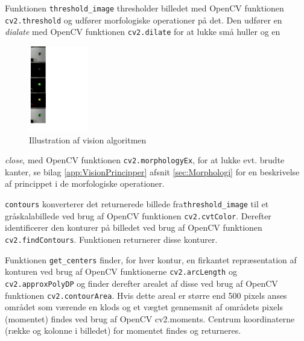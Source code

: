 Funktionen \texttt{threshold\_image} thresholder billedet med OpenCV funktionen \texttt{cv2.threshold} og udfører morfologiske operationer på det.
Den udfører en \textit{dialate} med OpenCV funktionen \texttt{cv2.dilate} for at lukke små huller og en

\begin{figure}
  \begin{center}
    \includegraphics[width=0.23\textwidth]{figurer/ImagesFromVision}
  \end{center}
  \caption{Illustration af vision algoritmen}\label{fig:ImagesFromVision}
\end{figure}

\textit{close}, med OpenCV funktionen \texttt{cv2.morphologyEx}, for at lukke evt. brudte kanter, se bilag \ref{app:VisionPrincipper} afsnit \vref{sec:Morphologi} for en beskrivelse af princippet i de morfologiske operationer.

\texttt{contours} konverterer det returnerede billede fra\newline \texttt{threshold\_image} til et gråskalabillede ved brug af OpenCV funktionen \texttt{cv2.cvtColor}.
Derefter identificerer den konturer på billedet ved brug af OpenCV funktionen \texttt{cv2.findContours}.
Funktionen returnerer disse konturer.

Funktionen \texttt{get\_centers} finder, for hver kontur, en firkantet repræsentation af konturen ved brug af OpenCV funktionerne \texttt{cv2.arcLength} og \texttt{cv2.approxPolyDP} og finder derefter arealet af disse ved brug af OpenCV funktionen \texttt{cv2.contourArea}.
Hvis dette areal er større end 500 pixels anses området som værende en klods og et vægtet gennemsnit af områdets pixels (momentet) findes ved brug af OpenCV cv2.moments.
Centrum koordinaterne (række og kolonne i billedet) for momentet findes og returneres. 

